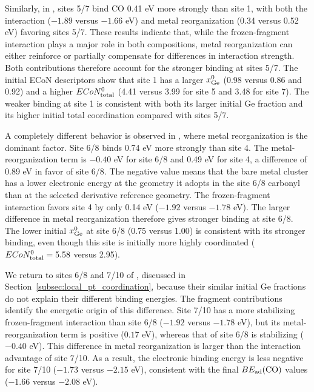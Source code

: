 Similarly, in , sites 5/7 bind CO 0.41 eV more strongly than site 1, with both the interaction ($-1.89$ versus $-1.66$ eV) and metal reorganization (0.34 versus 0.52 eV) favoring sites 5/7. These results indicate that, while the frozen-fragment interaction plays a major role in both compositions, metal reorganization can either reinforce or partially compensate for differences in interaction strength. Both contributions therefore account for the stronger binding at sites 5/7. The initial ECoN descriptors show that site 1 has a larger $x_{\rm Ge}^{0}$ (0.98 versus 0.86 and 0.92) and a higher $ECoN_{\rm total}^{0}$ (4.41 versus 3.99 for site 5 and 3.48 for site 7). The weaker binding at site 1 is consistent with both its larger initial Ge fraction and its higher initial total coordination compared with sites 5/7.

A completely different behavior is observed in , where metal reorganization is the dominant factor. {Site 6/8 binds  0.74 eV more strongly than site 4. The metal-reorganization term is $-0.40$ eV for site 6/8 and 0.49 eV for site 4, a difference of 0.89 eV in favor of site 6/8. The negative value means that the bare metal cluster has a lower electronic energy at the geometry it adopts in the site 6/8 carbonyl than at the selected derivative reference geometry. The frozen-fragment interaction favors site 4 by only 0.14 eV ($-1.92$ versus $-1.78$ eV). The larger difference in metal reorganization therefore gives stronger  binding at site 6/8. The lower initial $x_{\rm Ge}^{0}$ at site 6/8 (0.75 versus 1.00) is consistent with its stronger binding, even though this site is initially more highly coordinated ($ECoN_{\rm total}^{0}=5.58$ versus 2.95).}

We return to sites 6/8 and 7/10 of , discussed in Section~\ref{subsec:local_pt_coordination}, because their similar initial Ge fractions do not explain their different binding energies. The fragment contributions identify the energetic origin of this difference. Site 7/10 has a more stabilizing frozen-fragment interaction than site 6/8 ($-1.92$ versus $-1.78$ eV), but its metal-reorganization term is positive ($0.17$ eV), whereas that of site 6/8 is stabilizing ($-0.40$ eV). This difference in metal reorganization is larger than the interaction advantage of site 7/10. As a result, the electronic binding energy is less negative for site 7/10 ($-1.73$ versus $-2.15$ eV), consistent with the final $BE_{\rm ad}(\ce{CO})$ values ($-1.66$ versus $-2.08$ eV).

